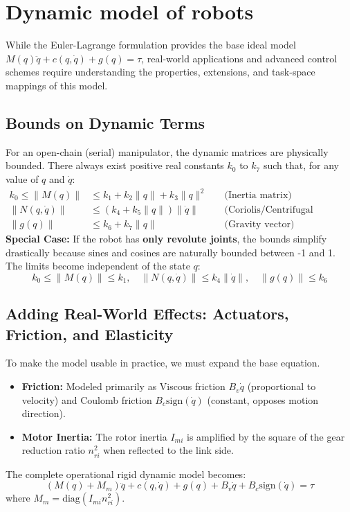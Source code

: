 \documentclass[11pt,a4paper]{article}
\begin{document}
\section{Dynamic model of robots}

While the Euler-Lagrange formulation provides the base ideal model $M(q)\ddot{q} + c(q,\dot{q}) + g(q) = \tau$, real-world applications and advanced control schemes require understanding the properties, extensions, and task-space mappings of this model.

\subsection{Bounds on Dynamic Terms}
For an open-chain (serial) manipulator, the dynamic matrices are physically bounded. There always exist positive real constants $k_0$ to $k_7$ such that, for any value of $q$ and $\dot{q}$:
\begin{align}
    k_0 \le \|M(q)\| &\le k_1 + k_2\|q\| + k_3\|q\|^2 \quad &\text{(Inertia matrix)} \\
    \|N(q,\dot{q})\| &\le (k_4 + k_5\|q\|)\|\dot{q}\| \quad &\text{(Coriolis/Centrifugal factorization)} \\
    \|g(q)\| &\le k_6 + k_7\|q\| \quad &\text{(Gravity vector)}
\end{align}
\textbf{Special Case:} If the robot has \textbf{only revolute joints}, the bounds simplify drastically because sines and cosines are naturally bounded between -1 and 1. The limits become independent of the state $q$:
\begin{equation}
    k_0 \le \|M(q)\| \le k_1, \quad \|N(q,\dot{q})\| \le k_4\|\dot{q}\|, \quad \|g(q)\| \le k_6
\end{equation}

\subsection{Adding Real-World Effects: Actuators, Friction, and Elasticity}
To make the model usable in practice, we must expand the base equation.
\begin{itemize}
    \item \textbf{Friction:} Modeled primarily as Viscous friction $B_v\dot{q}$ (proportional to velocity) and Coulomb friction $B_c\text{sign}(\dot{q})$ (constant, opposes motion direction).
    \item \textbf{Motor Inertia:} The rotor inertia $I_{mi}$ is amplified by the square of the gear reduction ratio $n_{ri}^2$ when reflected to the link side.
\end{itemize}
The complete operational rigid dynamic model becomes:
\begin{equation}
    (M(q) + M_m)\ddot{q} + c(q,\dot{q}) + g(q) + B_v\dot{q} + B_c\text{sign}(\dot{q}) = \tau
\end{equation}
where $M_m = \text{diag}(I_{mi}n_{ri}^2)$.
\end{document}
